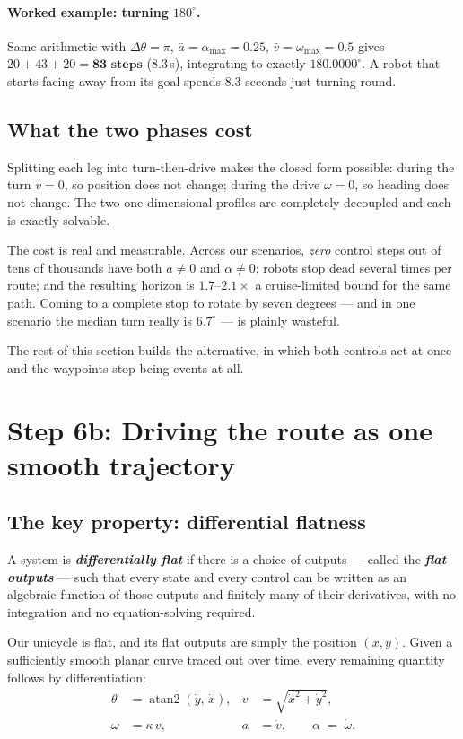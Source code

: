 \documentclass[11pt,a4paper]{article}
\newcommand{\defn}[1]{\textbf{\textit{#1}}}
\begin{document}
\paragraph{Worked example: turning $180^\circ$.} Same arithmetic with
$\Delta\theta = \pi$, $\bar{a} = \alpha_{\max} = 0.25$, $\bar{v} = \omega_{\max} = 0.5$
gives $20 + 43 + 20 = \textbf{83 steps}$ ($8.3$\,s), integrating to exactly $180.0000^\circ$.
A robot that starts facing away from its goal spends $8.3$ seconds just turning round.

\subsection{What the two phases cost}

Splitting each leg into turn-then-drive makes the closed form possible: during the turn
$v = 0$, so position does not change; during the drive $\omega = 0$, so heading does not
change. The two one-dimensional profiles are completely decoupled and each is exactly
solvable.

The cost is real and measurable. Across our scenarios, \emph{zero} control steps out of
tens of thousands have both $a \ne 0$ and $\alpha \ne 0$; robots stop dead several times
per route; and the resulting horizon is $1.7$--$2.1\times$ a cruise-limited bound for the
same path. Coming to a complete stop to rotate by seven degrees --- and in one scenario the
median turn really is $6.7^\circ$ --- is plainly wasteful.

The rest of this section builds the alternative, in which both controls act at once and the
waypoints stop being events at all.

\section{Step 6b: Driving the route as one smooth trajectory}
\label{sec:flat}

\subsection{The key property: differential flatness}

A system is \defn{differentially flat} if there is a choice of outputs --- called the
\defn{flat outputs} --- such that every state and every control can be written as an
algebraic function of those outputs and finitely many of their derivatives, with no
integration and no equation-solving required.

Our unicycle is flat, and its flat outputs are simply the position $(x, y)$. Given a
sufficiently smooth planar curve traced out over time, every remaining quantity follows by
differentiation:
\begin{align}
\theta &= \operatorname{atan2}(\dot{y},\, \dot{x}),
&v &= \sqrt{\dot{x}^2 + \dot{y}^2}, \label{eq:flat1}\\
\omega &= \kappa\, v,
&a &= \dot{v}, \qquad \alpha \;=\; \dot{\omega}. \label{eq:flat2}
\end{align}
\end{document}
